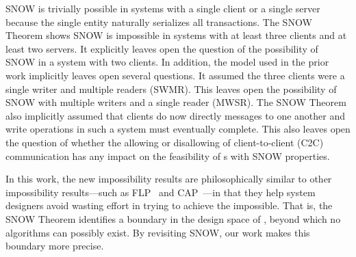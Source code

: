 SNOW is trivially possible in systems with a single client or a single server because the single entity naturally serializes all transactions.
The SNOW Theorem shows SNOW is impossible in systems with at least three clients and at least two servers.
It explicitly leaves open the question of the possibility of SNOW in a system with two clients.
{\color{blue}
In addition, the model used in the prior work implicitly leaves open several questions.
It assumed the three clients were a single writer and multiple readers (SWMR).
This leaves open the possibility of SNOW with multiple writers and a single reader (MWSR).
The SNOW Theorem also implicitly assumed that clients do now directly messages to one another and write operations in such a system must eventually complete.
This also leaves open the question of whether the allowing or disallowing of client-to-client (C2C) communication has any impact on the feasibility of \rot{}s with SNOW properties.
}

In this work, the new impossibility results %
are philosophically similar to other impossibility results---such as FLP~\cite{Fischer:pds1983} and CAP~\cite{Brewer:pdc2000, Gilbert:sigact2002}---in that they help system designers avoid wasting effort in trying to achieve the impossible. That is, the SNOW Theorem identifies a boundary in the design space of \rots{}, beyond which no algorithms can possibly exist. By revisiting SNOW, our work makes this boundary more precise.


